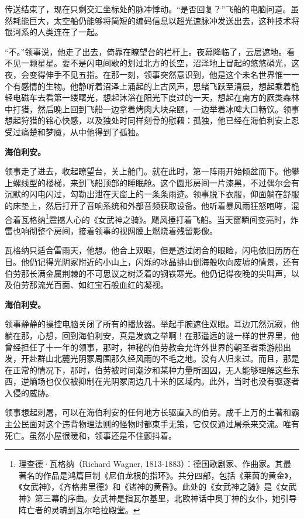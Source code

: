 \documentclass[AutoFakeBold=true]{book}
\begin{document}
传送结束了，现在只剩交汇坐标处的脉冲悸动。``是否回复？''飞船的电脑问道。虽然耗能巨大，太空船仍能够将简短的编码信息以超光速脉冲发送出去，这种技术将银河系的人类连在了一起。

``不。''领事说，他走了出去，倚靠在瞭望台的栏杆上。夜幕降临了，云层遮地。看不见一颗星星。要不是闪电间歇的划过北方的长空，沼泽地上冒起的悠悠磷光，这夜，会变得伸手不见五指。在那一刻，领事突然意识到，他是这个未名世界惟一一个有感情的生物。他静听着沼泽上涌起的上古风声，思绪飞跃至清晨，想起乘着桅轻电磁车去看第一缕曙光，想起沐浴在阳光下度过的一天，想起在南方的厥类森林中打猎，然后晚上回到飞船一边拿着烤肉大块朵颐，一边举着冰啤大口畅饮。领事想起狩猎的铭心快感，以及独处时同样刻骨的慰藉：孤独，他已经在海伯利安上忍受过痛楚和梦魇，从中他得到了孤独。

{\bf \kaishu 海伯利安。}

领事走了进去，收起瞭望台，关上舱门。就在此时，第一阵雨开始倾盆而下。他攀上螺线型的楼梯，来到飞船顶部的睡眠舱。这个圆形房间一片漆黑，不过偶尔会有沉默的闪电闪过，勾勒出泄在天窗上的一条条雨迹。领事脱下衣服，仰面躺在舒服的床垫上，然后打开了音响系统和外部音频获取设备。他听着暴风雨狂怒咆哮，混合着瓦格纳\footnote{理查德·瓦格纳（Richard Wagner, 1813-1883）：德国歌剧家、作曲家。其最著名的作品是鸿篇巨制《尼伯龙根的指环》。共分四部，包括《莱茵的黄金》，《女武神》，《齐格弗里德》和《诸神的黄昏》。此处的《女武神之骑》是《女武神》第三幕的序曲。女武神是指瓦尔基里，北欧神话中奥丁神的女仆，她引导阵亡者的灵魂到瓦尔哈拉殿堂。}震撼人心的《女武神之骑》。飓风捶打着飞船。当天窗瞬间变亮时，炸雷也响彻整个房间，接着领事的视网膜上燃烧着残留影像。

{\kaishu 瓦格纳只适合雷雨天}，他想。他合上双眼，但是透过闭合的眼睑，闪电依旧历历在目。他仍记得光阴冢附近的小山上，闪烁的冰晶排山倒海般吹向废墟的情景，还有伯劳那长满金属荆棘的不可思议之树泛着的钢铁寒光。他仍记得夜晚的尖叫声，以及伯劳那流光百面、如红宝石般血红的凝视。

{\bf \kaishu 海伯利安。}

领事静静的操控电脑关闭了所有的播放器。举起手腕遮住双眼。耳边兀然沉寂，他躺在那，心想，回到海伯利安，真是发疯之举啊！在那遥远的谜一样的世界里，他曾经担任了十一年的领事，那时，神秘的伯劳教会允许外世界的朝圣者乘游船出发，开赴群山北麓光阴冢周围那久经风雨的不毛之地。没有人归来过。而且，那是在正常的情况下，那时，伯劳被时间潮汐和某种力量所困囚，无人能够理解这些东西，逆熵场也仅仅被抑制在光阴冢周边几十米的区域内。此外，当时也没有驱逐者入侵的威胁。

领事想起刺屠，可以在海伯利安的任何地方长驱直入的伯劳。成千上万的土著和霸主公民面对这个违背物理法则的怪物时都束手无策，它仅仅通过屠杀来交流。唯有死亡。虽然小屋很暖和，领事还是不住颤抖着。
\end{document}
